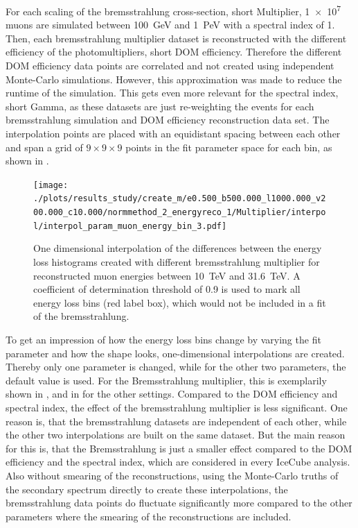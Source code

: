 For each scaling of the bremsstrahlung cross-section, short Multiplier, \num{1e7} muons are simulated between \SI{100}{GeV} and \SI{1}{PeV} with a spectral index of \num{1}.
Then, each bremsstrahlung multiplier dataset is reconstructed with the different efficiency of the photomultipliers, short DOM efficiency.
Therefore the different DOM efficiency data points are correlated and not created using independent Monte-Carlo simulations.
However, this approximation was made to reduce the runtime of the simulation.
This gets even more relevant for the spectral index, short Gamma, as these datasets are just re-weighting the events for each bremsstrahlung simulation and DOM efficiency reconstruction data set.
The interpolation points are placed with an equidistant spacing between each other and span a grid of $9\times9\times9$ points in the fit parameter space for each bin, as shown in .
\begin{figure}
    \centering
    \texttt{[image: ./plots/results\_study/create\_m/e0.500\_b500.000\_l1000.000\_v200.000\_c10.000/normmethod\_2\_energyreco\_1/Multiplier/interpol/interpol\_param\_muon\_energy\_bin\_3.pdf]}
    \caption{One dimensional interpolation of the differences between the energy loss histograms created with different bremsstrahlung multiplier for reconstructed muon energies between \SI{10}{TeV} and \SI{31.6}{TeV}. A coefficient of determination threshold of \num{0.9} is used to mark all energy loss bins (red label box), which would not be included in a fit of the bremsstrahlung.}
    \label{fig:study_1d_interpol_mu3_te}
\end{figure}


To get an impression of how the energy loss bins change by varying the fit parameter and how the shape looks, one-dimensional interpolations are created.
Thereby only one parameter is changed, while for the other two parameters, the default value is used.
For the Bremsstrahlung multiplier, this is exemplarily shown in , and in  for the other settings.
Compared to the DOM efficiency and spectral index, the effect of the bremsstrahlung multiplier is less significant.
One reason is, that the bremsstrahlung datasets are independent of each other, while the other two interpolations are built on the same dataset.
But the main reason for this is, that the Bremsstrahlung is just a smaller effect compared to the DOM efficiency and the spectral index, which are considered in every IceCube analysis.
Also without smearing of the reconstructions, using the Monte-Carlo truths of the secondary spectrum directly to create these interpolations, the bremsstrahlung data points do fluctuate significantly more compared to the other parameters where the smearing of the reconstructions are included.

